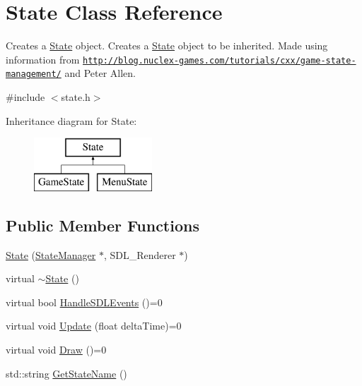 \hypertarget{class_state}{\section{State Class Reference}
\label{class_state}
}


Creates a \hyperlink{class_state}{State} object. Creates a \hyperlink{class_state}{State} object to be inherited. Made using information from \href{http://blog.nuclex-games.com/tutorials/cxx/game-state-management/}{\tt http\+://blog.\+nuclex-\/games.\+com/tutorials/cxx/game-\/state-\/management/} and Peter Allen.  




{\ttfamily \#include $<$state.\+h$>$}

Inheritance diagram for State\+:\begin{figure}[H]
\begin{center}
\leavevmode
\includegraphics[height=2.000000cm]{class_state}
\end{center}
\end{figure}
\subsection*{Public Member Functions}
\begin{DoxyCompactItemize}
\item 
\hyperlink{class_state_abd80317215e3d5a83becc409050dd22f}{State} (\hyperlink{class_state_manager}{State\+Manager} $\ast$, S\+D\+L\+\_\+\+Renderer $\ast$)
\item 
virtual \hyperlink{class_state_afab438d92b90dc18d194dbd9c9c8bab3}{$\sim$\+State} ()
\item 
virtual bool \hyperlink{class_state_a648d9182cab9aeb914ef778f94e2b437}{Handle\+S\+D\+L\+Events} ()=0
\item 
virtual void \hyperlink{class_state_a770f40188fdfc64bc95a5166fef12e02}{Update} (float delta\+Time)=0
\item 
virtual void \hyperlink{class_state_a8b0cdb0e7450a9bb3580a33dfbe4d981}{Draw} ()=0
\item 
std\+::string \hyperlink{class_state_ab7a5d1c1837b4b44b3563897777fcb26}{Get\+State\+Name} ()
\end{DoxyCompactItemize}
